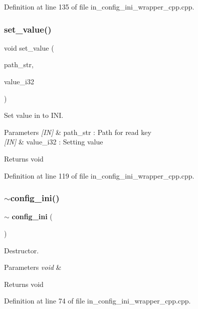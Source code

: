 Definition at line 135 of file in\+\_\+config\+\_\+ini\+\_\+wrapper\+\_\+cpp.\+cpp.

\mbox{\label{group__configuration_ga0b75d6dee5d53a292d4d26db9ac24882}} 
\subsubsection{set\_value()}
{\footnotesize\ttfamily void set\+\_\+value (\begin{DoxyParamCaption}\item[{wx\+String}]{path\+\_\+str,  }\item[{int32\+\_\+t}]{value\+\_\+i32 }\end{DoxyParamCaption})}



Set value in to I\+NI. 


\begin{DoxyParams}{Parameters}
{\em \mbox{[}\+I\+N\mbox{]}} & path\+\_\+str \+: Path for read key \\
\hline
{\em \mbox{[}\+I\+N\mbox{]}} & value\+\_\+i32 \+: Setting value \\
\hline
\end{DoxyParams}
\begin{DoxyReturn}{Returns}
void 
\end{DoxyReturn}


Definition at line 119 of file in\+\_\+config\+\_\+ini\+\_\+wrapper\+\_\+cpp.\+cpp.

\mbox{\label{group__configuration_ga5e5c813dadc6ca0243b9f61ff2a228a2}} 
\subsubsection{$\sim$config\_ini()}
{\footnotesize\ttfamily $\sim$\textbf{ config\+\_\+ini} (\begin{DoxyParamCaption}\item[{void}]{ }\end{DoxyParamCaption})}



Destructor. 


\begin{DoxyParams}{Parameters}
{\em void} & \\
\hline
\end{DoxyParams}
\begin{DoxyReturn}{Returns}
void 
\end{DoxyReturn}


Definition at line 74 of file in\+\_\+config\+\_\+ini\+\_\+wrapper\+\_\+cpp.\+cpp.

